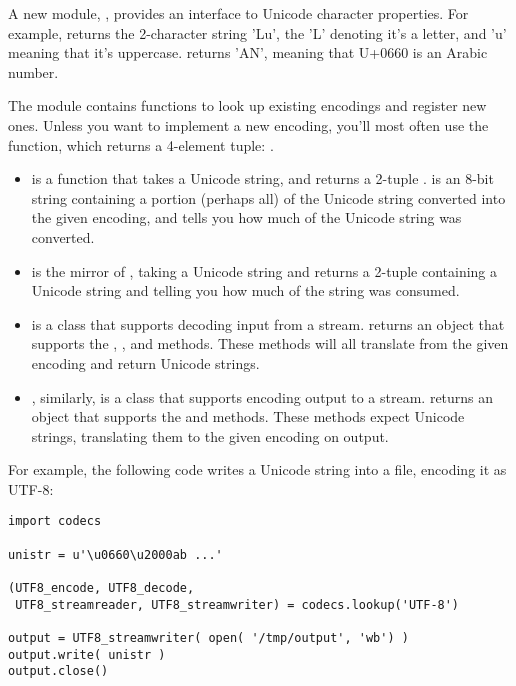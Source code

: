 \documentclass{howto}
\begin{document}
A new module, , provides an interface to Unicode
character properties.  For example, 
returns the 2-character string 'Lu', the 'L' denoting it's a letter,
and 'u' meaning that it's uppercase.
 returns 'AN', meaning that U+0660 is
an Arabic number.

The  module contains functions to look up existing encodings
and register new ones.  Unless you want to implement a
new encoding, you'll most often use the
 function, which returns a
4-element tuple: .

\begin{itemize}
\item {} is a function that takes a Unicode string, and
returns a 2-tuple .  
is an 8-bit string containing a portion (perhaps all) of the Unicode
string converted into the given encoding, and  tells you how much of the Unicode string was converted.

\item {} is the mirror of , 
taking a Unicode string and
returns a 2-tuple  containing a Unicode string
and  telling you how much of the string was consumed.

\item {} is a class that supports decoding input from
a stream.   returns an object that
supports the , , and
 methods.  These methods will all translate from
the given encoding and return Unicode strings.

\item {}, similarly, is a class that supports
encoding output to a stream.  
returns an object that supports the  and
 methods.  These methods expect Unicode strings,
translating them to the given encoding on output.
\end{itemize}

For example, the following code writes a Unicode string into a file, 
encoding it as UTF-8:

\begin{verbatim}
import codecs

unistr = u'\u0660\u2000ab ...'

(UTF8_encode, UTF8_decode,
 UTF8_streamreader, UTF8_streamwriter) = codecs.lookup('UTF-8')

output = UTF8_streamwriter( open( '/tmp/output', 'wb') )
output.write( unistr )
output.close()
\end{verbatim}
\end{document}
